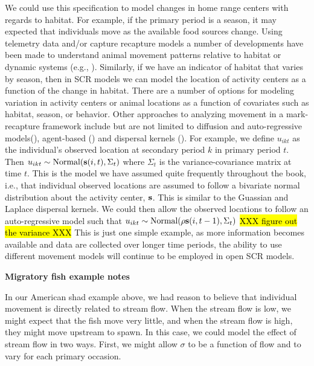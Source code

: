 We could use this specification to model changes in  home range
centers with regards to habitat.  For example, if the primary period
is a season, it may expected that individuals move as
the available food sources change. Using telemetry data and/or capture recapture models
a number of developments have been made to understand animal movement patterns relative
to habitat or dynamic systems (e.g., \cite{jonsen_etal:2005, hooten_wikle:2010}).
Similarly, if we have an indicator of habitat that varies by season, then in SCR models
we can model the location of activity centers as a function of the change in habitat.
There are a number of options for modeling variation in activity centers or animal locations as
a function of covariates such as habitat, season, or behavior.
Other approaches to analyzing movement in a mark-recapture framework include but are not limited to
diffusion and auto-regressive models(\cite{ovaskainen:2004,
ovaskainen_etal:2008}), agent-based (\cite{grimm_etal:2005, hooten_etal:2010})
and dispersal kernels (\cite{fujiwara_etal:2006}).  For example, we define $u_{ikt}$ as the individual's
observed location
at secondary period $k$ in primary period $t$.
Then
$u_{ikt} \sim  \mbox{Normal}({\bf s}(i,t), \Sigma_t)$ where $\Sigma_t$
is the variance-covariance matrix at time $t$.  This is the model
we have assumed quite frequently throughout the book, i.e., that individual observed locations are
assumed to follow a bivariate normal distribution about the activity center, ${\bf s}$. This
is similar to the Guassian and Laplace dispersal kernels.  We could then allow the observed locations
to follow an auto-regressive model such that $u_{ikt} \sim  \mbox{Normal}(\rho {\bf s}(i,t-1), \Sigma_t)$
\hl{XXX figure out the variance XXX}  This is just one simple example, as more information becomes available
and data are collected
over longer time periods, the ability to use different movement models will continue to be employed
in open SCR models.





{\bf Migratory fish example notes}

In our American shad example above, we had reason to believe
that individual movement is directly related to stream flow.  When the
stream flow is low,
we might expect that the fish move very little, and when the stream
flow is high, they might
move upstream to spawn. In this case,
we could model the effect of stream flow in two ways.  First, we might allow $\sigma$
to be a function of flow and to vary for each primary occasion.

